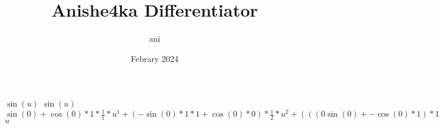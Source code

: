 \documentclass{article}
\title{Anishe4ka Differentiator}
\author{ani}
\date{Febrary 2024}
\begin{document}
\maketitle
$\sin(u)$\newline
$\sin(u)$\newline
$\sin(0)+\cos(0)*1*\frac{1}{1}*{u}^{1}+(-\sin(0)*1*1+\cos(0)*0)*\frac{1}{2}*{u}^{2}+(((0\sin(0)+-\cos(0)*1)*1+-\sin(0)*0)*1+-\sin(0)*1*0+-\sin(0)*1*0+\cos(0)*0)*\frac{1}{9}*{u}^{3}$\newline
$u$\newline
\end{document}
